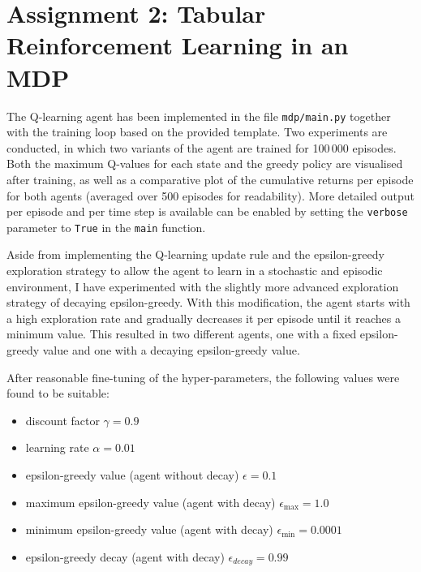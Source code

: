 \documentclass[10pt]{article}
\begin{document}
    \section{Assignment 2: Tabular Reinforcement Learning in an MDP}

    The Q-learning agent has been implemented in the file \texttt{mdp/main.py} together with the training loop
    based on the provided template.
    Two experiments are conducted, in which two variants of the agent are trained for 100\,000 episodes.
    Both the maximum Q-values for each state and the greedy policy are visualised after training, as well as a
    comparative plot of the cumulative returns per episode for both agents (averaged over 500 episodes for readability).
    More detailed output per episode and per time step is available can be enabled by setting the \texttt{verbose}
    parameter to \texttt{True} in the \texttt{main} function.

    Aside from implementing the Q-learning update rule and the epsilon-greedy exploration strategy to allow the agent
    to learn in a stochastic and episodic environment, I have experimented with the slightly more advanced exploration strategy
    of decaying epsilon-greedy.
    With this modification, the agent starts with a high exploration rate and gradually decreases it per episode
    until it reaches a minimum value.
    This resulted in two different agents, one with a fixed epsilon-greedy value and one with a decaying epsilon-greedy value.

    After reasonable fine-tuning of the hyper-parameters, the following values were found to be suitable:
    \begin{itemize}
        \item discount factor $\gamma=0.9$
        \item learning rate $\alpha = 0.01$
        \item epsilon-greedy value (agent without decay) $\epsilon=0.1$
        \item maximum epsilon-greedy value (agent with decay) $\epsilon_{\max}=1.0$
        \item minimum epsilon-greedy value (agent with decay) $\epsilon_{\min}=0.0001$
        \item epsilon-greedy decay (agent with decay) $\epsilon_{decay}=0.99$
    \end{itemize}
\end{document}
